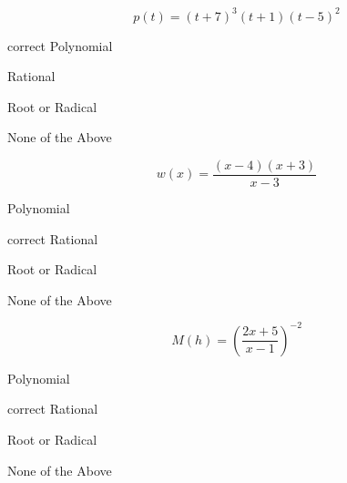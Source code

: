 \documentclass{ximera}
\begin{document}
\begin{exercise}
\begin{question}
\end{question}









\begin{question}


\[
p(t) = (t+7)^3 (t+1) (t-5)^2
\]

\begin{multipleChoice}
\item [correct]{Polynomial}
\item {Rational}
\item {Root or Radical}
\item {None of the Above}
\end{multipleChoice}


\end{question}












\begin{question}


\[
w(x) = \frac{(x - 4)(x + 3)}{x - 3}
\]

\begin{multipleChoice}
\item {Polynomial}
\item [correct]{Rational}
\item {Root or Radical}
\item {None of the Above}
\end{multipleChoice}


\end{question}











\begin{question}


\[
M(h) = \left( \frac{2x+5}{x-1} \right)^{-2}
\]

\begin{multipleChoice}
\item {Polynomial}
\item [correct]{Rational}
\item {Root or Radical}
\item {None of the Above}
\end{multipleChoice}


\end{question}











\end{exercise}
\end{document}
